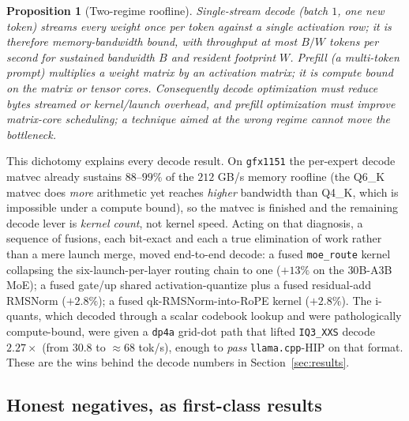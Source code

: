 \documentclass[11pt]{article}
\newtheorem{proposition}{Proposition}
\begin{document}
\begin{proposition}[Two-regime roofline]
\label{prop:tworegime}
Single-stream decode (batch $1$, one new token) streams every weight once per token against a single
activation row; it is therefore \emph{memory-bandwidth bound}, with throughput at most $B/W$ tokens
per second for sustained bandwidth $B$ and resident footprint $W$. Prefill (a multi-token prompt)
multiplies a weight matrix by an activation matrix; it is \emph{compute bound} on the matrix or
tensor cores. Consequently decode optimization must reduce bytes streamed or kernel/launch overhead,
and prefill optimization must improve matrix-core scheduling; a technique aimed at the wrong regime
cannot move the bottleneck.
\end{proposition}

This dichotomy explains every decode result. On \texttt{gfx1151} the per-expert decode matvec already
sustains $88$--$99\%$ of the $212$ GB/s memory roofline (the Q6\_K matvec does \emph{more} arithmetic
yet reaches \emph{higher} bandwidth than Q4\_K, which is impossible under a compute bound), so the
matvec is finished and the remaining decode lever is \emph{kernel count}, not kernel speed. Acting on
that diagnosis, a sequence of fusions, each bit-exact and each a true elimination of work rather than
a mere launch merge, moved end-to-end decode: a fused \texttt{moe\_route} kernel collapsing the
six-launch-per-layer routing chain to one ($+13\%$ on the $30$B-A3B MoE); a fused gate/up shared
activation-quantize plus a fused residual-add RMSNorm ($+2.8\%$); a fused qk-RMSNorm-into-RoPE kernel
($+2.8\%$). The i-quants, which decoded through a scalar codebook lookup and were pathologically
compute-bound, were given a \texttt{dp4a} grid-dot path that lifted \texttt{IQ3\_XXS} decode
$2.27\times$ (from $30.8$ to $\approx 68$ tok/s), enough to \emph{pass} \texttt{llama.cpp}-HIP on that
format. These are the wins behind the decode numbers in Section~\ref{sec:results}.

\subsection{Honest negatives, as first-class results}
\label{sec:negatives}
\end{document}
